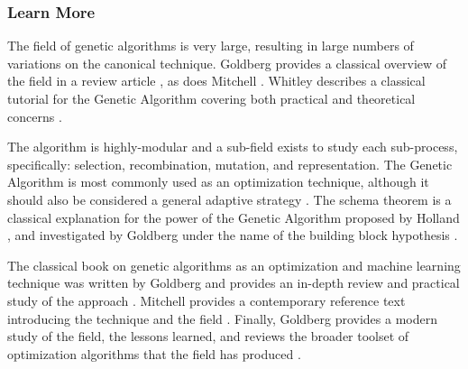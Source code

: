 % 
% 
\subsubsection{Learn More}
The field of genetic algorithms is very large, resulting in large numbers of variations on the canonical technique.
Goldberg provides a classical overview of the field in a review article \cite{Goldberg1994}, as does Mitchell \cite{Mitchell1995}.
Whitley describes a classical tutorial for the Genetic Algorithm covering both practical and theoretical concerns \cite{Whitley1994}.

The algorithm is highly-modular and a sub-field exists to study each sub-process, specifically: selection, recombination, mutation, and representation. The Genetic Algorithm is most commonly used as an optimization technique, although it should also be considered a general adaptive strategy \cite{Jong1992}. The schema theorem is a classical explanation for the power of the Genetic Algorithm proposed by Holland  \cite{Holland1975}, and investigated by Goldberg under the name of the building block hypothesis \cite{Goldberg1989}.

The classical book on genetic algorithms as an optimization and machine learning technique was written by Goldberg and provides an in-depth review and practical study of the approach \cite{Goldberg1989}. Mitchell provides a contemporary reference text introducing the technique and the field \cite{Mitchell1998}. Finally, Goldberg provides a modern study of the field, the lessons learned, and reviews the broader toolset of optimization algorithms that the field has produced \cite{Goldberg2002}.


